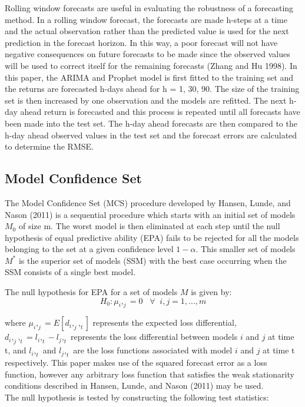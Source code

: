 \documentclass[12pt,a4paper]{article}
\numberwithin{equation}{section}
\numberwithin{figure}{section}
\numberwithin{table}{section}
\begin{document}
Rolling window forecasts are useful in evaluating the robustness of a
forecasting method. In a rolling window forecast, the forecasts are made
h-steps at a time and the actual observation rather than the predicted
value is used for the next prediction in the forecast horizon. In this
way, a poor forecast will not have negative consequences on future
forecasts to be made since the observed values will be used to correct
itself for the remaining forecasts (Zhang and Hu 1998). In this paper,
the ARIMA and Prophet model is first fitted to the training set and the
returns are forecasted h-days ahead for h = 1, 30, 90. The size of the
training set is then increased by one observation and the models are
refitted. The next h-day ahead return is forecasted and this process is
repeated until all forecasts have been made into the test set. The h-day
ahead forecasts are then compared to the h-day ahead observed values in
the test set and the forecast errors are calculated to determine the
RMSE.

\subsection{Model Confidence Set}\label{model-confidence-set}

The Model Confidence Set (MCS) procedure developed by Hansen, Lunde, and
Nason (2011) is a sequential procedure which starts with an initial set
of models \(M_0\) of size m. The worst model is then eliminated at each
step until the null hypothesis of equal predictive ability (EPA) fails
to be rejected for all the models belonging to the set at a given
confidence level \(1 - \alpha\). This smaller set of models \(M^*\) is
the superior set of models (SSM) with the best case occurring when the
SSM consists of a single best model.

The null hypothesis for EPA for a set of models \(M\) is given by:
\[H_0: \mu_i,_j = 0 \;\;\; \forall \;\; i,j = 1,...,m\]

where \(\mu_i,_j = E[d_i,_j,_t]\) represents the expected loss
differential, \(d_i,_j,_t = l_i,_t - l_j,_t\) represents the loss
differential between models \(i\) and \(j\) at time t, and \(l_i,_t\)
and \(l_j,_t\) are the loss functions associated with model \(i\) and
\(j\) at time t respectively. This paper makes use of the squared
forecast error as a loss function, however any arbitrary loss function
that satisfies the weak stationarity conditions described in Hansen,
Lunde, and Nason (2011) may be used.\\
The null hypothesis is tested by constructing the following test
statistics:
\end{document}
